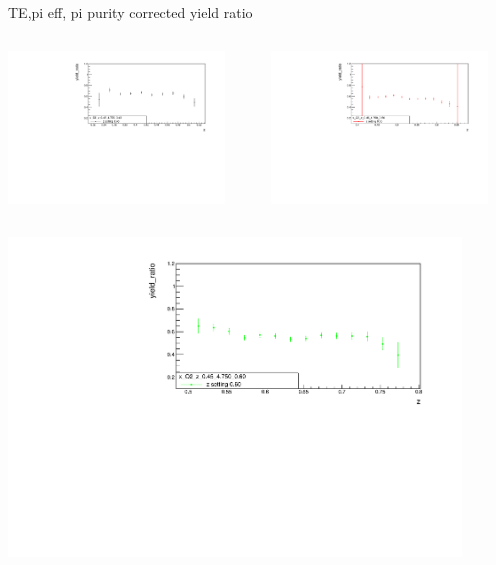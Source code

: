 \begin{frame}{TE,pi eff, pi purity corrected yield ratio}
\begin{columns}
\begin{column}[T]{0.5\textwidth}
\includegraphics[width = 0.9\textwidth]{results/yield/statistics_corr/x_Q2_z_0.45_4.750_0.40_ratio.pdf}
\end{column}
\begin{column}[T]{0.5\textwidth}
\includegraphics[width = 0.9\textwidth]{results/yield/statistics_corr/x_Q2_z_0.45_4.750_0.50_ratio.pdf}
\end{column}
\end{columns}
\begin{columns}
\begin{column}[T]{0.5\textwidth}
\includegraphics[width = 0.9\textwidth]{results/yield/statistics_corr/x_Q2_z_0.45_4.750_0.60_ratio.pdf}

\end{column}
\end{columns}
\end{frame}
